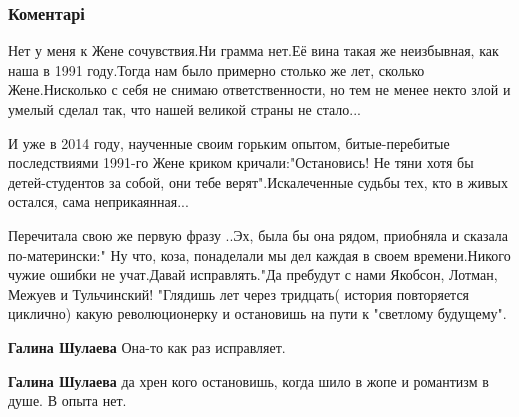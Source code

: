  
 
 
 
 
\subsubsection{Коментарі}
\label{sec:13_09_2021.fb.nikonov_sergej.4.bilchenko_lekcia.cmt}

\begin{itemize} %

Нет у меня к Жене сочувствия.Ни грамма нет.Её вина такая же неизбывная, как
наша в 1991 году.Тогда нам было примерно столько же лет, сколько Жене.Нисколько
с себя не снимаю ответственности, но тем не менее некто злой и умелый сделал
так, что нашей великой страны не стало...

И уже в 2014 году, наученные своим горьким опытом, битые-перебитые
последствиями 1991-го Жене криком кричали:"Остановись! Не тяни хотя бы
детей-студентов за собой, они тебе верят".Искалеченные судьбы тех, кто в живых
остался, сама неприкаянная...

Перечитала свою же первую фразу ..Эх, была бы она рядом, приобняла и сказала
по-матерински:" Ну что, коза, понаделали мы дел каждая в своем времени.Никого
чужие ошибки не учат.Давай исправлять."Да пребудут с нами Якобсон, Лотман,
Межуев и Тульчинский! "Глядишь лет через тридцать( история повторяется
циклично) какую революционерку и остановишь на пути к "светлому будущему".

\begin{itemize} %
\textbf{Галина Шулаева} Она-то как раз исправляет.

\textbf{Галина Шулаева} да хрен кого остановишь, когда шило в жопе и романтизм в душе. В опыта нет.
\end{itemize} %

\end{itemize} %

